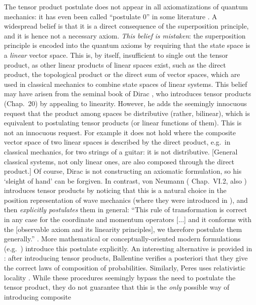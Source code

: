 \documentclass[aps,prl,amsmath,amssymb,twocolumn,nofootinbib]{revtex4}
\theoremstyle{plain}
\theoremstyle{definition}
\theoremstyle{remark}
\begin{document}
The tensor product postulate does not appear in all axiomatizations of
quantum mechanics: it has even been called ``postulate 0'' in some
literature \cite{zurek}. A widespread belief is that it is a direct
consequence of the superposition principle, and it is hence not a
necessary axiom. {\em This belief is mistaken}: the superposition
principle is encoded into the quantum axioms by requiring that the
state space is a {\em linear} vector space. This is, by itself,
insufficient to single out the tensor product, as other linear
products of linear spaces exist, such as the direct product, the
topological product or the direct sum of vector spaces, which are used
in classical mechanics to combine state spaces of linear systems.
This belief may have arisen from the seminal book of Dirac
\cite{diracbook}, who introduces tensor products (Chap.~20) by
appealing to linearity. However, he adds the seemingly innocuous
request that the product among spaces be distributive (rather,
bilinear), which is equivalent to postulating tensor products (or
linear functions of them). This is not an innocuous request. For
example it does not hold where the composite vector space of two
linear spaces is described by the direct product, e.g.~in classical
mechanics, for two strings of a guitar: it is not distributive.
[General classical systems, not only linear ones, are also composed
through the direct product.] Of course, Dirac is not constructing an
axiomatic formulation, so his `sleight of hand' can be forgiven. In
contrast, von Neumann (\cite{vonneumannbook} Chap.~VI.2, also
\cite{jauch}) introduces tensor products by noticing that this is a
natural choice in the position representation of wave mechanics (where
they were introduced in \cite{weyl,epr}), and then {\em explicitly
  postulates} them in general: ``This rule of transformation is
correct in any case for the coordinate and momentum operators [...]
and it conforms with the [observable axiom and its linearity
principles], we therefore postulate them generally.''
\cite{vonneumannbook}.  More mathematical or conceptually-oriented
modern formulations (e.g.~\cite{ozawa,masanes,wootters,nielsenchuang})
introduce this postulate explicitly.  An interesting alternative is
provided in \cite{ballentinebook,ballentinepaper}: after introducing
tensor products, Ballentine verifies a posteriori that they give the
correct laws of composition of probabilities. Similarly, Peres uses
relativistic locality \cite{peres}. While these procedures seemingly
bypass the need to postulate the tensor product, they do not guarantee
that this is the {\em only} possible way of introducing composite
\end{document}
